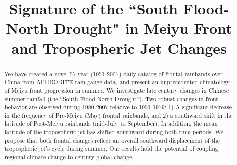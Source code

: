 \documentclass[draft,grl]{AGUTeX}
\begin{document}
%
%


\title{Signature of the ``South Flood-North Drought" in Meiyu Front and Tropospheric Jet Changes}

%
%







%
%


\begin{abstract}
We have created a novel 57-year (1951-2007) daily catalog of frontal rainbands over China from APHRODITE rain gauge data, and present an unprecedented climatology of Meiyu front progression in summer. We investigate late  century changes in Chinese summer rainfall (the ``South Flood-North Drought''). Two robust changes in front behavior are observed during 1980-2007 relative to 1951-1979: 1) A significant decrease in the frequency of Pre-Meiyu (May) frontal rainbands, and 2) a southward shift in the latitude of Post-Meiyu rainbands (mid-July to September). In addition, the mean latitude of the tropospheric jet has shifted southward during both time periods. We propose that both frontal changes reflect an overall southward displacement of the tropospheric jet's cycle during summer. Our results hold the potential of coupling regional climate change to  century global change. 

\end{abstract}
\end{document}
